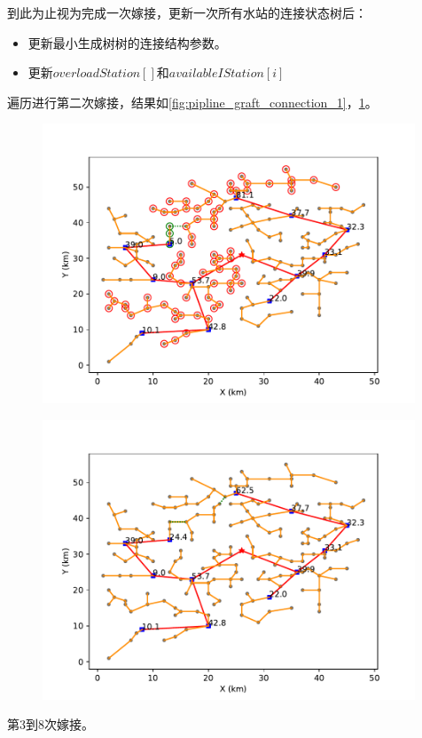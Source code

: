\documentclass{cumcmthesis}
\begin{document}
  到此为止视为完成一次嫁接，更新一次所有水站的连接状态树后：
  \begin{itemize}
    \item 更新最小生成树树的连接结构参数。
    \item 更新$overloadStation[]$和$availableIStation[i]$
  \end{itemize}
  遍历进行第二次嫁接，结果如\cref{fig:pipline_graft_connection_1}，\cref{fig:pipline_graft_cut_1}。

  \begin{figure}[!h]
    \centering
    \begin{minipage}[c]{0.45\textwidth}
        \centering
        \includegraphics[width=0.99\textwidth]{figure/pipline_graft_connection_1.pdf}
        \label{fig:pipline_graft_connection_1}
    \end{minipage}
    \begin{minipage}[c]{0.45\textwidth}
        \centering
        \includegraphics[width=0.99\textwidth]{figure/pipline_graft_cut_1.pdf}
        \label{fig:pipline_graft_cut_1}
    \end{minipage}
  \end{figure}
  第3到8次嫁接。
\end{document}

